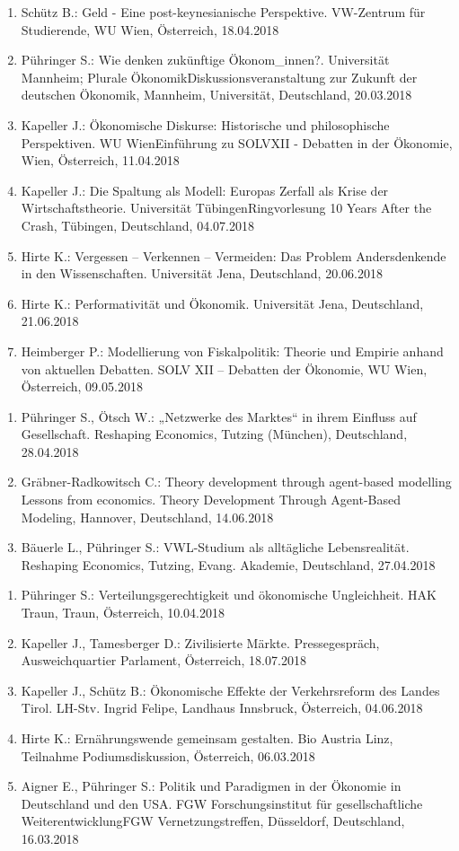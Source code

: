 \begin{enumerate}
	\item Schütz B.: Geld - Eine post-keynesianische Perspektive. VW-Zentrum für Studierende, WU Wien, Österreich, 18.04.2018
	\item Pühringer S.: Wie denken zukünftige Ökonom\_innen?. Universität Mannheim; Plurale ÖkonomikDiskussionsveranstaltung zur Zukunft der deutschen Ökonomik, Mannheim, Universität, Deutschland, 20.03.2018
	\item Kapeller J.: Ökonomische Diskurse: Historische und philosophische Perspektiven. WU WienEinführung zu SOLVXII - Debatten in der Ökonomie, Wien, Österreich, 11.04.2018
	\item Kapeller J.: Die Spaltung als Modell: Europas Zerfall als Krise der Wirtschaftstheorie. Universität TübingenRingvorlesung 10 Years After the Crash, Tübingen, Deutschland, 04.07.2018
	\item Hirte K.: Vergessen – Verkennen – Vermeiden: Das Problem Andersdenkende in den Wissenschaften. Universität Jena, Deutschland, 20.06.2018
	\item Hirte K.: Performativität und Ökonomik. Universität Jena, Deutschland, 21.06.2018
	\item Heimberger P.: Modellierung von Fiskalpolitik: Theorie und Empirie anhand von aktuellen Debatten. SOLV XII – Debatten der Ökonomie, WU Wien, Österreich, 09.05.2018
\end{enumerate}

\begin{enumerate}
	\item Pühringer S., Ötsch W.: „Netzwerke des Marktes“ in ihrem Einfluss auf Gesellschaft. Reshaping Economics, Tutzing (München), Deutschland, 28.04.2018
	\item Gräbner-Radkowitsch C.: Theory development through agent-based modelling Lessons from economics. Theory Development Through Agent-Based Modeling, Hannover, Deutschland, 14.06.2018
	\item Bäuerle L., Pühringer S.: VWL-Studium als alltägliche Lebensrealität. Reshaping Economics, Tutzing, Evang. Akademie, Deutschland, 27.04.2018
\end{enumerate}

\begin{enumerate}
	\item Pühringer S.: Verteilungsgerechtigkeit und ökonomische Ungleichheit. HAK Traun, Traun, Österreich, 10.04.2018
	\item Kapeller J., Tamesberger D.: Zivilisierte Märkte. Pressegespräch, Ausweichquartier Parlament, Österreich, 18.07.2018
	\item Kapeller J., Schütz B.: Ökonomische Effekte der Verkehrsreform des Landes Tirol. LH-Stv. Ingrid Felipe, Landhaus Innsbruck, Österreich, 04.06.2018
	\item Hirte K.: Ernährungswende gemeinsam gestalten. Bio Austria Linz, Teilnahme Podiumsdiskussion, Österreich, 06.03.2018
	\item Aigner E., Pühringer S.: Politik und Paradigmen in der Ökonomie in Deutschland und den USA. FGW Forschungsinstitut für gesellschaftliche WeiterentwicklungFGW Vernetzungstreffen, Düsseldorf, Deutschland, 16.03.2018
\end{enumerate}

